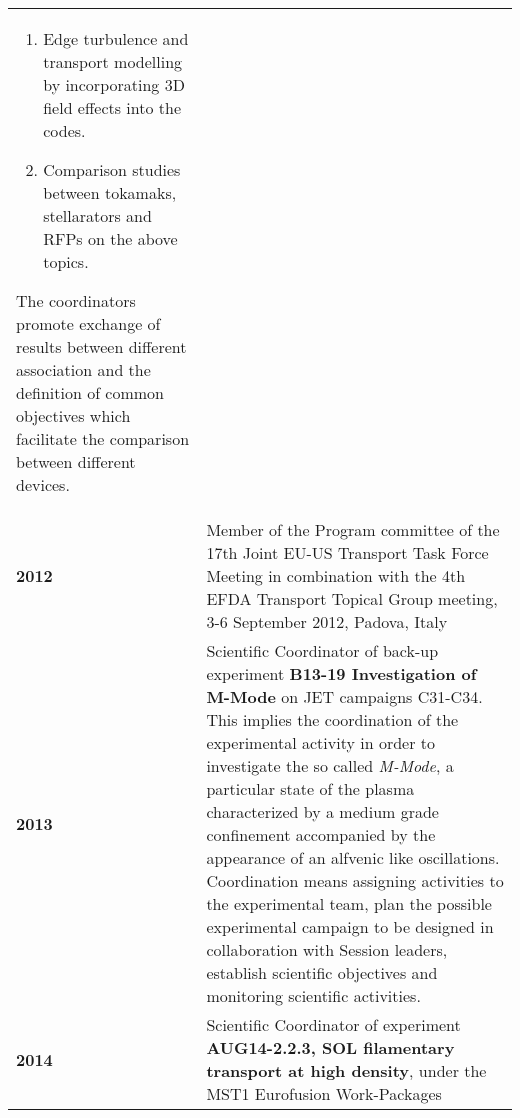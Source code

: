 \begin{longtable}{>{\bfseries}l p{11cm}}
\begin{enumerate}
\item Edge turbulence and transport modelling by incorporating 3D field effects into the codes.
\item Comparison studies between tokamaks, stellarators and RFPs on the above topics.
\end{enumerate}
The coordinators promote exchange of results between different
association and the definition of common objectives which facilitate
the comparison between different devices. \\
2012 & Member of the Program committee of the 17th Joint EU-US Transport Task Force
Meeting in combination with the 4th EFDA Transport Topical Group
meeting, 3-6 September 2012, Padova, Italy \\
2013 & Scientific Coordinator of back-up experiment \textbf{B13-19
  Investigation of M-Mode} on JET
campaigns C31-C34. This implies the coordination of the experimental activity
in order to investigate the so called \emph{M-Mode},  a particular
state of the plasma characterized by a medium grade confinement
accompanied by the appearance of an alfvenic like
oscillations. Coordination means assigning activities to the
experimental team, plan the possible experimental campaign to be
designed in collaboration with Session leaders,  establish scientific
objectives and monitoring scientific activities. \\
2014 & Scientific Coordinator of experiment \textbf{AUG14-2.2.3, SOL
filamentary transport at high density}, under the MST1 Eurofusion
Work-Packages \\

\end{longtable}

